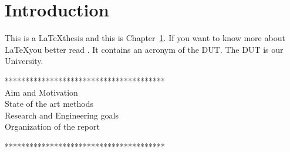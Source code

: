     \chapter{Introduction} \label{chap:intro}

    This is a \LaTeX thesis and this is Chapter\ \ref{chap:intro}.
    If you want to know more about \LaTeX you better read
    \cite{texbook}.  It contains an acronym
    of the \ac{DUT}. The \ac{DUT} is our University. 
    \cleardoublepage
    
    ***************************************\\
    Aim and Motivation\\
    State of the art methods\\
    Research and Engineering goals\\
    Organization of the report
    
    ***************************************\\